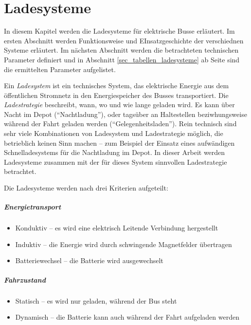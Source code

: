 \chapter{Ladesysteme}
In diesem Kapitel werden die Ladesysteme für elektrische Busse erläutert. Im ersten Abschnitt werden Funktionsweise und EInsatzgeschichte der verschiednen Systeme erläutert. Im nächsten Abschnitt werden die betrachteten technischen Parameter definiert und in Abschnitt \ref{sec_tabellen_ladesysteme} ab Seite \pageref{sec_tabellen_ladesysteme} sind die ermittelten Parameter aufgelistet.

Ein \emph{Ladesystem} ist ein technisches System, das elektrische Energie aus dem öffentlichen Stromnetz in den Energiespeicher des Busses transportiert. Die \emph{Ladestrategie} beschreibt, wann, wo und wie lange geladen wird. Es kann über Nacht im Depot ("`Nachtladung"'), oder tagsüber an Haltestellen beziwhungsweise während der Fahrt geladen werden ("`Gelegenheitsladen"'). Rein technisch sind sehr viele Kombinationen von Ladesystem und Ladestrategie möglich, die betrieblich keinen Sinn machen – zum Beispiel der Einsatz eines aufwändigen Schnelladesystems für die Nachtladung im Depot. In dieser Arbeit werden Ladesysteme zusammen mit der für dieses System sinnvollen Ladestrategie betrachtet.

Die Ladesysteme werden nach drei Kriterien aufgeteilt:
\paragraph{Energietransport}
\begin{itemize}
	\item Konduktiv – es wird eine elektrisch Leitende Verbindung hergestellt
	\item Induktiv – die Energie wird durch schwingende Magnetfelder übertragen
	\item Batteriewechsel – die Batterie wird ausgewechselt
\end{itemize}

\paragraph{Fahrzustand}
\begin{itemize}
	\item Statisch – es wird nur geladen, während der Bus steht
	\item Dynamisch – die Batterie kann auch während der Fahrt aufgeladen werden
\end{itemize}

